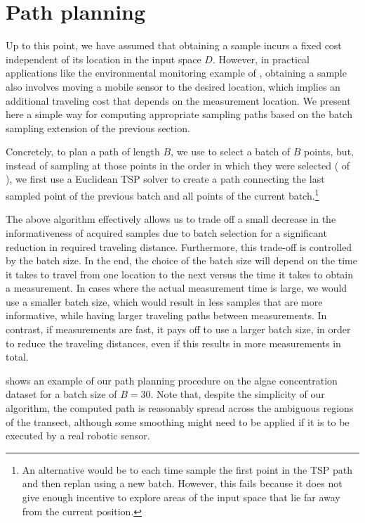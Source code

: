\section{Path planning} \label{sect:pp}
Up to this point, we have assumed that obtaining a sample incurs a fixed
cost independent of its location in the input space $D$. However, in practical
applications like the environmental monitoring example of ,
obtaining a sample also involves moving a mobile sensor to the desired
location, which implies an additional traveling cost that depends on the
measurement location. We present here a simple way for
computing appropriate sampling paths based on the batch sampling
extension of the previous section.

Concretely, to plan a path of length $B$, we use \bacl to select a batch of
$B$ points, but, instead of sampling at those points in the order in which
they were selected
( of ), we first use a
Euclidean TSP solver to create a path connecting the last sampled point of
the previous batch and all points of the current
batch.\footnote{An alternative would be to each time sample the first
point in the TSP path and then replan using a new batch. However, this fails
because it does not give enough incentive to explore areas of the input space
that lie far away from the current position.}

The above algorithm effectively allows us to trade off a small decrease in
the informativeness of acquired samples due to batch selection for a
significant reduction in required traveling distance. Furthermore, this
trade-off is controlled by the batch size. In the end, the choice of the
batch size will depend on the time it takes to travel from one location
to the next versus the time it takes to obtain a measurement. In cases
where the actual measurement time is large, we would use a smaller
batch size, which would result in less samples that are more informative,
while having larger traveling paths between measurements.
In contrast, if measurements are fast, it pays off to use a larger batch
size, in order to reduce the traveling distances, even if this results
in more measurements in total.

 shows an example of our path planning
procedure on the algae concentration dataset for a batch size of $B=30$.
Note that, despite the simplicity of our algorithm, the computed path
is reasonably spread across the ambiguous regions of the transect,
although some smoothing might need to be applied if it is to be executed
by a real robotic sensor.


